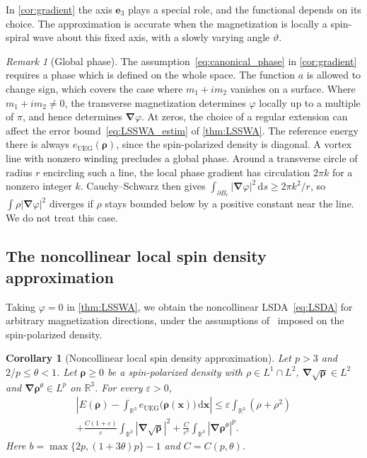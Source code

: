 \documentclass[final,reqno]{amsart}
\newtheorem{corollary}[theorem]{Corollary}
\theoremstyle{remark}
\newtheorem{remark}{Remark}
\renewcommand{\le}{\leqslant}
\renewcommand{\ge}{\geqslant}
\renewcommand{\epsilon}{\varepsilon}
\newcommand{\RR}{\mathbb{R}}
\newcommand{\UEG}{\mathrm{UEG}}
\newcommand{\grad}{\bm{\nabla}}
\newcommand{\dd}{\mathrm{d}}
\begin{document}
In \cref{cor:gradient} the axis $\mathbf{e}_3$ plays a special role, and the functional depends on its choice. The approximation is accurate when the magnetization is locally a spin-spiral wave about this fixed axis, with a slowly varying angle $\vartheta$.

\begin{remark}[Global phase]\label{rmk:global_phase}
The assumption~\cref{eq:canonical_phase} in \cref{cor:gradient} requires a phase which is defined on the whole space. The function $a$ is allowed to change sign, which covers the case where $m_1+im_2$ vanishes on a surface. Where $m_1+im_2\ne0$, the transverse magnetization determines $\varphi$ locally up to a multiple of $\pi$, and hence determines $\grad\varphi$. At zeros, the choice of a regular extension can affect the error bound~\cref{eq:LSSWA_estim} of \cref{thm:LSSWA}. The reference energy there is always $e_\UEG(\bm{\rho})$, since the spin-polarized density is diagonal. A vortex line with nonzero winding precludes a global phase. Around a transverse circle of radius $r$ encircling such a line, the local phase gradient has circulation $2\pi k$ for a nonzero integer $k$. Cauchy--Schwarz then gives $\int_{\partial B_r}|\grad\varphi|^2\,\dd s\ge2\pi k^2/r$, so $\int\rho|\grad\varphi|^2$ diverges if $\rho$ stays bounded below by a positive constant near the line. We do not treat this case.
\end{remark}

\subsection{The noncollinear local spin density approximation}\label{sec:lsda}
Taking $\varphi=0$ in \cref{thm:LSSWA}, we obtain the noncollinear LSDA~\cref{eq:LSDA} for arbitrary magnetization directions, under the assumptions of~\cite{lewin2020local} imposed on the spin-polarized density.

\begin{corollary}[Noncollinear local spin density approximation]\label{cor:LSDA}
Let $p>3$ and $2/p\le\theta<1$. Let $\bm{\rho}\ge0$ be a spin-polarized density with $\rho\in L^1\cap L^2$, $\grad\sqrt{\bm{\rho}}\in L^2$ and $\grad\bm{\rho}^\theta\in L^p$ on $\RR^3$. For every $\epsilon>0$,
\begin{multline}\label{eq:LDA_main_estim}
\left|E(\bm{\rho})-\int_{\RR^3}e_\UEG\big(\bm{\rho}(\mathbf{x})\big)\,\dd\mathbf{x}\right|
\le\epsilon\int_{\RR^3}(\rho+\rho^2)\\
+\frac{C(1+\epsilon)}{\epsilon}\int_{\RR^3}|\grad\sqrt{\bm{\rho}}|^2
+\frac{C}{\epsilon^b}\int_{\RR^3}|\grad\bm{\rho}^\theta|^p.
\end{multline}
Here $b=\max\{2p,(1+3\theta)p\}-1$ and $C=C(p,\theta)$.
\end{corollary}
\end{document}
